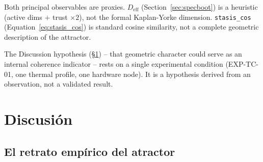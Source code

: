 \documentclass[11pt, a4paper]{article}
\begin{document}
\begin{description}[itemsep=0.55em]
  \item[Proxy metrics]
    Both principal observables are proxies.
    $D_\text{eff}$ (Section~\ref{sec:specboot}) is a heuristic (active dims
    $+$ trust $\times 2$), not the formal Kaplan-Yorke dimension.
    \texttt{stasis\_cos} (Equation~\ref{eq:stasis_cos}) is standard cosine
    similarity, not a complete geometric description of the attractor.

  \item[Alignment: single observation, not systematic validation]
    The Discussion hypothesis (\S\ref{sec:discussion}) -- that geometric
    character could serve as an internal coherence indicator -- rests on
    a single experimental condition (EXP-TC-01, one thermal profile, one
    hardware node).
    It is a hypothesis derived from an observation, not a validated result.

\end{description}


\section{Discusión}
\label{sec:discussion}

\subsection{El retrato empírico del atractor}
\end{document}
